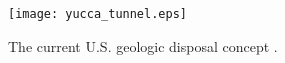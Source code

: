 \begin{figure}[htbp!]
  \begin{center}
    \texttt{[image: yucca\_tunnel.eps]}
  \end{center}
  \caption{The current U.S. geologic disposal concept \cite{peters_what_2013, 
  original_source_2011}.}
  \label{fig:yucca_tunnel}
\end{figure}
